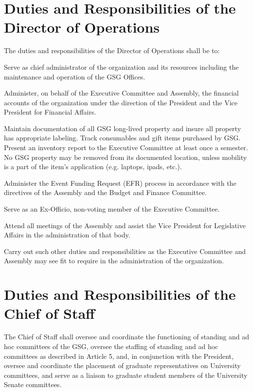 \section{Duties and Responsibilities of the Director of Operations}
The duties and responsibilities of the Director of Operations shall be to:
\begin{bylaws-number}
  \item Serve as chief administrator of the organization and its resources including the maintenance and operation of the GSG Offices.
  \item Administer, on behalf of the Executive Committee and Assembly, the financial accounts of the organization under the direction of the President and the Vice President for Financial Affairs.
  \item Maintain documentation of all GSG long-lived property and insure all property has appropriate labeling. Track consumables and gift items purchased by GSG. Present an inventory report to the Executive Committee at least once a semester. No GSG property may be removed from its documented location, unless mobility is a part of the item’s application (e.g. laptops, ipads, etc.).
  \item Administer the Event Funding Request (EFR) process in accordance with the directives of the Assembly and the Budget and Finance Committee.
  \item Serve as an Ex-Officio, non-voting member of the Executive Committee.
  \item Attend all meetings of the Assembly and assist the Vice President for Legislative Affairs in the administration of that body.
  \item Carry out such other duties and responsibilities as the Executive Committee and Assembly may see fit to require in the administration of the organization.
\end{bylaws-number}

\section{Duties and Responsibilities of the Chief of Staff}
\begin{bylaws-number}
	\item The Chief of Staff shall oversee and coordinate the functioning of standing and ad hoc committees of the GSG, oversee the staffing of standing and ad hoc committees as described in Article 5, and, in conjunction with the President, oversee and coordinate the placement of graduate representatives on University committees, and serve as a liaison to graduate student members of the University Senate committees.
\end{bylaws-number}

